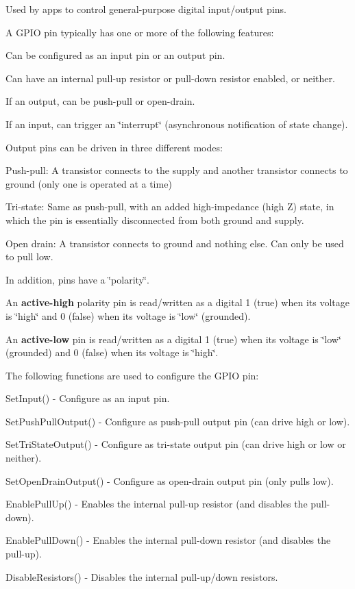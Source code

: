 Used by apps to control general-\/purpose digital input/output pins.

A G\+P\+I\+O pin typically has one or more of the following features\+:
\begin{DoxyItemize}
\item Can be configured as an input pin or an output pin.
\item Can have an internal pull-\/up resistor or pull-\/down resistor enabled, or neither.
\item If an output, can be push-\/pull or open-\/drain.
\item If an input, can trigger an \char`\"{}interrupt\char`\"{} (asynchronous notification of state change).
\end{DoxyItemize}

Output pins can be driven in three different modes\+:
\begin{DoxyItemize}
\item Push-\/pull\+: A transistor connects to the supply and another transistor connects to ground (only one is operated at a time)
\item Tri-\/state\+: Same as push-\/pull, with an added high-\/impedance (high Z) state, in which the pin is essentially disconnected from both ground and supply.
\item Open drain\+: A transistor connects to ground and nothing else. Can only be used to pull low.
\end{DoxyItemize}

In addition, pins have a \char`\"{}polarity\char`\"{}.
\begin{DoxyItemize}
\item An {\bfseries  active-\/high } polarity pin is read/written as a digital 1 (true) when its voltage is \char`\"{}high\char`\"{} and 0 (false) when its voltage is \char`\"{}low\char`\"{} (grounded).
\item An {\bfseries  active-\/low } pin is read/written as a digital 1 (true) when its voltage is \char`\"{}low\char`\"{} (grounded) and 0 (false) when its voltage is \char`\"{}high\char`\"{}.
\end{DoxyItemize}

The following functions are used to configure the G\+P\+I\+O pin\+:
\begin{DoxyItemize}
\item Set\+Input() -\/ Configure as an input pin.
\item Set\+Push\+Pull\+Output() -\/ Configure as push-\/pull output pin (can drive high or low).
\item Set\+Tri\+State\+Output() -\/ Configure as tri-\/state output pin (can drive high or low or neither).
\item Set\+Open\+Drain\+Output() -\/ Configure as open-\/drain output pin (only pulls low).
\item Enable\+Pull\+Up() -\/ Enables the internal pull-\/up resistor (and disables the pull-\/down).
\item Enable\+Pull\+Down() -\/ Enables the internal pull-\/down resistor (and disables the pull-\/up).
\item Disable\+Resistors() -\/ Disables the internal pull-\/up/down resistors.
\end{DoxyItemize}

